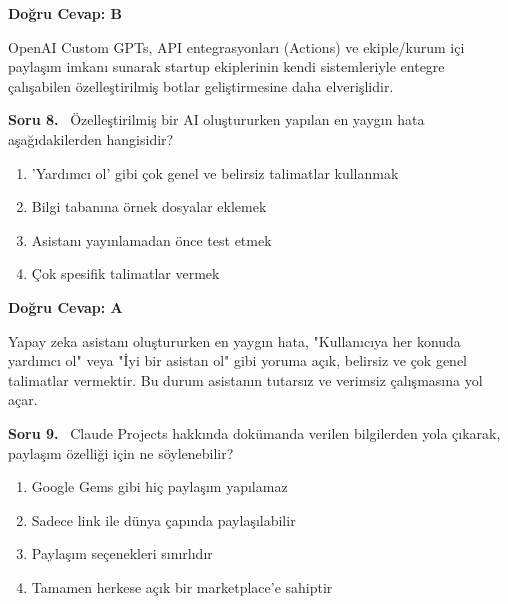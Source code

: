 \documentclass[11pt,a4paper,openany]{book}
\begin{document}
\vspace{4pt}
\begin{tcolorbox}[title=Cevap ve Açıklama, colback=gray!3!white, colframe=primarycolor!90!black, arc=2mm, fonttitle=\bfseries\sffamily, top=6pt, bottom=6pt]
    \textbf{Doğru Cevap: B}

    \vspace{2pt}
    OpenAI Custom GPTs, API entegrasyonları (Actions) ve ekiple/kurum içi paylaşım imkanı sunarak startup ekiplerinin kendi sistemleriyle entegre çalışabilen özelleştirilmiş botlar geliştirmesine daha elverişlidir.
\end{tcolorbox}
\vspace{10pt}
\needspace{5cm}
\vspace{8pt}
\noindent\textbf{\large\sffamily Soru 8.} \ Özelleştirilmiş bir AI oluştururken yapılan en yaygın hata aşağıdakilerden hangisidir?

\begin{enumerate}[label=\Alph*), leftmargin=25pt, topsep=4pt, itemsep=2pt]
        \item 'Yardımcı ol' gibi çok genel ve belirsiz talimatlar kullanmak
        \item Bilgi tabanına örnek dosyalar eklemek
        \item Asistanı yayınlamadan önce test etmek
        \item Çok spesifik talimatlar vermek
\end{enumerate}

\vspace{4pt}
\begin{tcolorbox}[title=Cevap ve Açıklama, colback=gray!3!white, colframe=primarycolor!90!black, arc=2mm, fonttitle=\bfseries\sffamily, top=6pt, bottom=6pt]
    \textbf{Doğru Cevap: A}

    \vspace{2pt}
    Yapay zeka asistanı oluştururken en yaygın hata, "Kullanıcıya her konuda yardımcı ol" veya "İyi bir asistan ol" gibi yoruma açık, belirsiz ve çok genel talimatlar vermektir. Bu durum asistanın tutarsız ve verimsiz çalışmasına yol açar.
\end{tcolorbox}
\vspace{10pt}
\needspace{5cm}
\vspace{8pt}
\noindent\textbf{\large\sffamily Soru 9.} \ Claude Projects hakkında dokümanda verilen bilgilerden yola çıkarak, paylaşım özelliği için ne söylenebilir?

\begin{enumerate}[label=\Alph*), leftmargin=25pt, topsep=4pt, itemsep=2pt]
        \item Google Gems gibi hiç paylaşım yapılamaz
        \item Sadece link ile dünya çapında paylaşılabilir
        \item Paylaşım seçenekleri sınırlıdır
        \item Tamamen herkese açık bir marketplace'e sahiptir
\end{enumerate}
\end{document}
